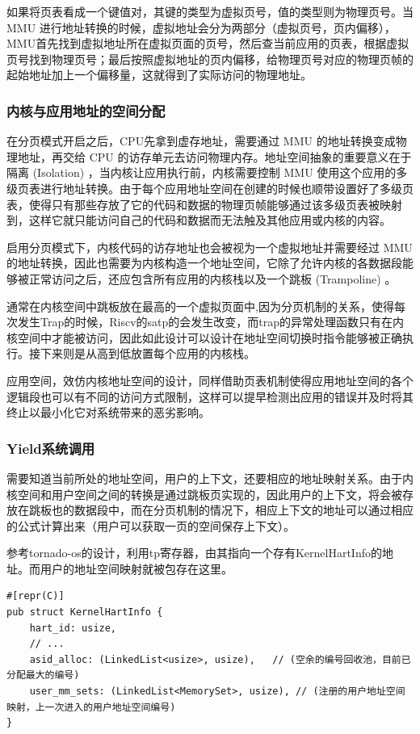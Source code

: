 如果将页表看成一个键值对，其键的类型为虚拟页号，值的类型则为物理页号。当 MMU 进行地址转换的时候，虚拟地址会分为两部分（虚拟页号，页内偏移），MMU首先找到虚拟地址所在虚拟页面的页号，然后查当前应用的页表，根据虚拟页号找到物理页号；最后按照虚拟地址的页内偏移，给物理页号对应的物理页帧的起始地址加上一个偏移量，这就得到了实际访问的物理地址。

\subsubsection{内核与应用地址的空间分配}

在分页模式开启之后，CPU先拿到虚存地址，需要通过 MMU 的地址转换变成物理地址，再交给 CPU 的访存单元去访问物理内存。地址空间抽象的重要意义在于 隔离 (Isolation) ，当内核让应用执行前，内核需要控制 MMU 使用这个应用的多级页表进行地址转换。由于每个应用地址空间在创建的时候也顺带设置好了多级页表，使得只有那些存放了它的代码和数据的物理页帧能够通过该多级页表被映射到，这样它就只能访问自己的代码和数据而无法触及其他应用或内核的内容。

启用分页模式下，内核代码的访存地址也会被视为一个虚拟地址并需要经过 MMU 的地址转换，因此也需要为内核构造一个地址空间，它除了允许内核的各数据段能够被正常访问之后，还应包含所有应用的内核栈以及一个跳板 (Trampoline) 。

通常在内核空间中跳板放在最高的一个虚拟页面中,因为分页机制的关系，使得每次发生Trap的时候，Riscv的satp的会发生改变，而trap的异常处理函数只有在内核空间中才能被访问，因此如此设计可以设计在地址空间切换时指令能够被正确执行。接下来则是从高到低放置每个应用的内核栈。

应用空间，效仿内核地址空间的设计，同样借助页表机制使得应用地址空间的各个逻辑段也可以有不同的访问方式限制，这样可以提早检测出应用的错误并及时将其终止以最小化它对系统带来的恶劣影响。

\subsubsection{Yield系统调用}

需要知道当前所处的地址空间，用户的上下文，还要相应的地址映射关系。由于内核空间和用户空间之间的转换是通过跳板页实现的，因此用户的上下文，将会被存放在跳板也的数据段中，而在分页机制的情况下，相应上下文的地址可以通过相应的公式计算出来（用户可以获取一页的空间保存上下文）。

参考tornado-os的设计，利用tp寄存器，由其指向一个存有KernelHartInfo的地址。而用户的地址空间映射就被包存在这里。

\begin{lstlisting}[caption=KernelHartInfo的结构]
#[repr(C)]
pub struct KernelHartInfo {
    hart_id: usize,
    // ...
    asid_alloc: (LinkedList<usize>, usize),   // (空余的编号回收池，目前已分配最大的编号)
    user_mm_sets: (LinkedList<MemorySet>, usize), // (注册的用户地址空间映射，上一次进入的用户地址空间编号)
}
\end{lstlisting}


